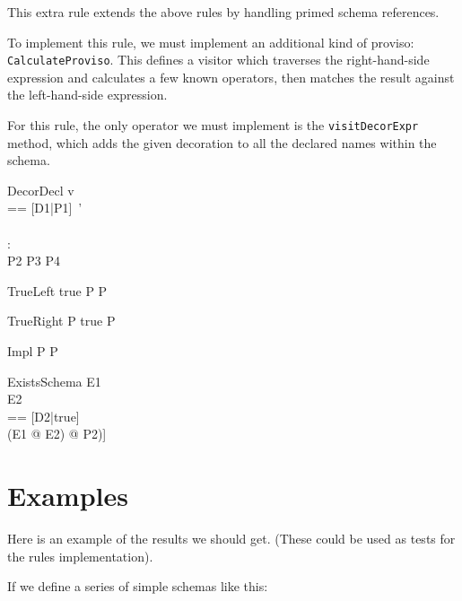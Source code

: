 \documentclass{article}
\begin{document}
This extra rule extends the above rules by handling primed schema
references.

To implement this rule, we must implement an additional kind of
proviso: \verb!CalculateProviso!.  This defines a visitor which
traverses the right-hand-side expression and calculates a few known
operators, then matches the result against the left-hand-side expression.

For this rule, the only operator we must implement is the
\verb!visitDecorExpr! method, which adds the given decoration to all the
declared names within the schema.

\begin{zedrule}{DecorDecl}
   v \unfoldsTo [D1 | P1] \\
   \proviso [D2|P2] == [D1|P1]~' \\
   [D | true] \unfoldsTo [D3 | P3] \\
   \proviso [D2 | true] \land [D3 | true] : \power [D4] \\
   P2 \land P3 \iff P4
\derives
   [v~'; D | true] \unfoldsTo [D4 | P4]
\end{zedrule}

\begin{zedrule}{TrueLeft}
  true \land P \iff P
\end{zedrule}

\begin{zedrule}{TrueRight}
  P \land true \iff P
\end{zedrule}

\begin{zedrule}{Impl}
  P \iff P
\end{zedrule}

\begin{zedrule}{ExistsSchema}
   E1 \unfoldsTo [D1 | P1] \\
   E2 \unfoldsTo [D2 | P2] \\
   \proviso [D3|true] == [D2|true] \schemaminus [D1|true] \\
\derives
   (\exists E1 @ E2) \unfoldsTo [D3 | (\exists [D1|P1] @ P2)]
\end{zedrule}


\section*{Examples}
Here is an example of the results we should get.
(These could be used as tests for the rules implementation).

If we define a series of simple schemas like this:
\end{document}

